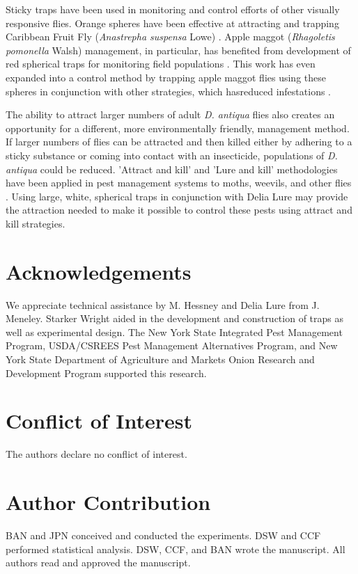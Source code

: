\documentclass[alpha-refs]{wiley-article}
\begin{document}
Sticky traps have been used in monitoring and control efforts of other visually responsive flies.  Orange spheres have been effective at attracting and trapping Caribbean Fruit Fly (\textit{Anastrepha suspensa} Lowe) \citep{sivinski1990colored}.  Apple maggot (\textit{Rhagoletis pomonella} Walsh) management, in particular, has benefited from development of red spherical traps for monitoring field populations \citep{prokopy1975apple, drummond1984comparative, duan1994apple}.  This work has even expanded into a control method by trapping apple maggot flies using these spheres in conjunction with other strategies, which hasreduced infestations \citep{bostanian1999managing}.  

The ability to attract larger numbers of adult \textit{D. antiqua} flies also creates an opportunity for a different, more environmentally friendly, management method. If larger numbers of flies can be attracted and then killed either by adhering to a sticky substance or coming into contact with an insecticide, populations of \textit{D. antiqua} could be reduced.  'Attract and kill' and 'Lure and kill' methodologies have been applied in pest management systems to moths, weevils, and other flies \citep{el2009potential,el2011bait,navarro2013efficacy,charmillot2000attract}.  Using large, white, spherical traps in conjunction with Delia Lure may provide the attraction needed to make it possible to control these pests using attract and kill strategies.  



\section*{Acknowledgements}
We appreciate technical assistance by M. Hessney and Delia Lure from J. Meneley. Starker Wright aided in the development and construction of traps as well as experimental design. The New York State Integrated Pest Management Program, USDA/CSREES Pest Management Alternatives Program, and New York State Department of Agriculture and Markets Onion Research and Development Program supported this research.  

\section*{Conflict of Interest}
The authors declare no conflict of interest.  

\section*{Author Contribution}
BAN and JPN conceived and conducted the experiments. DSW and CCF performed statistical analysis.  DSW, CCF, and BAN wrote the manuscript.  All authors read and approved the manuscript.    
\end{document}
